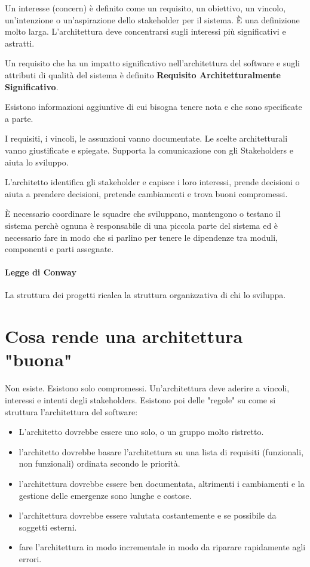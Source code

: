 Un interesse (concern) \`e definito come un requisito, un obiettivo, un vincolo, un'intenzione o un'aspirazione dello stakeholder per il sistema. \`E una definizione molto larga. L'architettura deve concentrarsi sugli interessi pi\`u significativi e astratti.

Un requisito che ha un impatto significativo nell'architettura del software e sugli attributi di qualit\`a del sistema \`e definito \textbf{Requisito Architetturalmente Significativo}.

Esistono informazioni aggiuntive di cui bisogna tenere nota e che sono specificate a parte.

I requisiti, i vincoli, le assunzioni vanno documentate. Le scelte architetturali vanno giustificate e spiegate.
Supporta la comunicazione con gli Stakeholders e aiuta lo sviluppo.

L'architetto identifica gli stakeholder e capisce i loro interessi, prende decisioni o aiuta a prendere decisioni, pretende cambiamenti e trova buoni compromessi.

\`E necessario coordinare le squadre che sviluppano, mantengono o testano il sistema perch\`e ognuna \`e responsabile di una piccola parte del sistema ed \`e necessario fare in modo che si parlino per tenere le dipendenze tra moduli, componenti e parti assegnate.

\paragraph{Legge di Conway}

La struttura dei progetti ricalca la struttura organizzativa di chi lo sviluppa.

\section{Cosa rende una architettura "buona"}

Non esiste. Esistono solo compromessi. Un'architettura deve aderire a vincoli, interessi e intenti degli stakeholders.
Esistono poi delle "regole" su come si struttura l'architettura del software: 

\begin{itemize}
  \item L'architetto dovrebbe essere uno solo, o un gruppo molto ristretto.
  \item l'architetto dovrebbe basare l'architettura su una lista di requisiti (funzionali, non funzionali) ordinata secondo le priorit\`a.
  \item l'architettura dovrebbe essere ben documentata, altrimenti i cambiamenti e la gestione delle emergenze sono lunghe e costose.
  \item l'architettura dovrebbe essere valutata costantemente e se possibile da soggetti esterni.
  \item fare l'architettura in modo incrementale in modo da riparare rapidamente agli errori.
\end{itemize}

